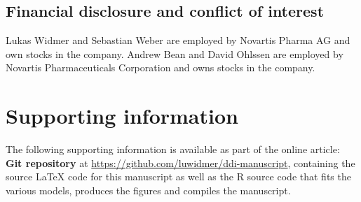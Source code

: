 \documentclass[AMA,STIX1COL]{WileyNJD-v2}
\begin{document}
\subsection*{Financial disclosure and conflict of interest}

Lukas Widmer and Sebastian Weber are employed by Novartis Pharma AG and own stocks in the company. Andrew Bean and David Ohlssen are employed by Novartis Pharmaceuticals Corporation and owns stocks in the company.


\section*{Supporting information}

The following supporting information is available as part of the online article:
\\

\noindent
\textbf{Git repository} at \url{https://github.com/luwidmer/ddi-manuscript}, containing the source LaTeX code for this manuscript as well as the R source code that fits the various models, produces the figures and compiles the manuscript.


\appendix

\nocite{*}%
%
\end{document}
